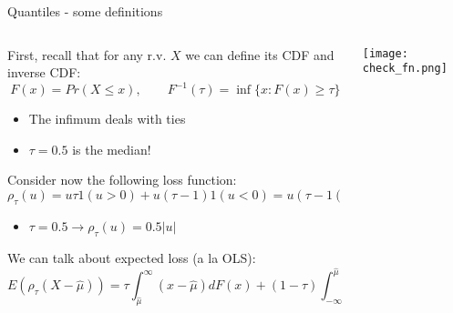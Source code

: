 \documentclass[notes,11pt, aspectratio=169]{beamer}
\newenvironment{wideitemize}{\itemize\addtolength{\itemsep}{10pt}}{\enditemize}
\begin{document}
\begin{frame}{Quantiles - some definitions}
  \begin{columns}[T] %
\begin{column}{.7\textwidth}
  \begin{wideitemize}
  \item First, recall that for any r.v. $X$ we can define its CDF and inverse CDF:
    $$F(x) = Pr(X \leq x), \qquad F^{-1}(\tau) = \inf\{x : F(x) \geq \tau\}$$
    \begin{itemize}
    \vspace{-15pt}      
    \item The infimum deals with ties
    \item $\tau = 0.5$ is the median!
    \end{itemize}
  \item Consider now the following loss function:
    $$ \rho_{\tau}(u) = u \tau 1(u > 0) + u(\tau-1) 1(u <0) = u(\tau - 1(u<0))$$
    \vspace{-15pt}
    \begin{itemize}
    \item $\tau = 0.5 \longrightarrow \rho_{\tau}(u) = 0.5|u|$
    \end{itemize}
  \item We can talk about expected loss (a la  OLS):
    $$ E(\rho_\tau(X - \hat{\mu})) = \tau \int_{\hat{\mu}}^{\infty} (x - \hat{\mu}) dF(x) + (1-\tau) \int^{\hat{\mu}}_{-\infty} (x - \hat{\mu}) dF(x)$$
  \end{wideitemize}
  \end{column}%
  \hfill%
  \begin{column}{.3\textwidth}
    \texttt{[image: check\_fn.png]}
  \end{column}
\end{columns}
\end{frame}
\end{document}
